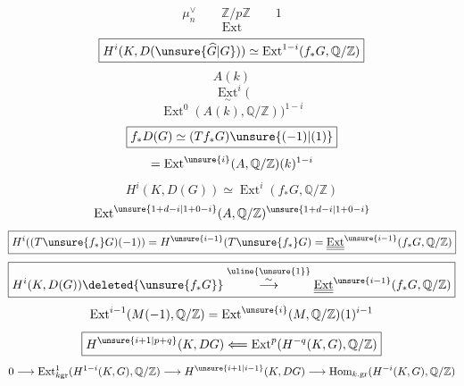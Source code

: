 \[
\mu_n^\vee\qquad\mathbb Z/p\mathbb Z\qquad1
\]
\[
\operatorname{Ext}
\]
\[
\boxed{H^i(K,D(\unsure{\widehat G|G}))\simeq
\operatorname{Ext}^{1-i}(f_*G,\mathbb Q/\mathbb Z)}
\]
\[
A(k)
\]
\[
\underset{\sim}{\operatorname{Ext}}^i(
\]
\[
\operatorname{Ext}^0(A(k),\mathbb Q/\mathbb Z))^{1-i}
\]
\[
\boxed{f_*D(G)\simeq(Tf_*G)\unsure{(-1)|(1)}}
\]
\[
=\operatorname{Ext}^{\unsure{i}}(A,\mathbb Q/\mathbb Z)(k)^{1-i}
\]
\[
H^i(K,D(G))\simeq\operatorname{Ext}^i(f_*G,\mathbb Q/\mathbb Z)
\]
\[
\operatorname{Ext}^{\unsure{1+d-i|1+0-i}}(A,\mathbb Q/\mathbb Z)^{\unsure{1+d-i|1+0-i}}
\]
\[
\boxed{H^i((T\unsure{f_*}G)(-1))=H^{\unsure{i-1}}(T\unsure{f_*}G)
=\underline{\underline{\operatorname{Ext}}}^{\unsure{i-1}}(f_*G,\mathbb Q/\mathbb Z)}
\]
\[
\boxed{H^i(K,D(G))\deleted{\unsure{f_*G}}
\overset{\uline{\unsure{1}}}{\overset{\sim}{\longrightarrow}}
\underline{\underline{\operatorname{Ext}}}^{\unsure{i-1}}(f_*G,\mathbb Q/\mathbb Z)}
\]
\[
\operatorname{Ext}^{i-1}(M(-1),\mathbb Q/\mathbb Z)
=\operatorname{Ext}^{\unsure{i}}(M,\mathbb Q/\mathbb Z)(1)^{i-1}
\]
\[
\boxed{H^{\unsure{i+1|p+q}}(K,DG)\Longleftarrow
\operatorname{Ext}^{p}(H^{-q}(K,G),\mathbb Q/\mathbb Z)}
\]
\[
0\longrightarrow\operatorname{Ext}^{1}_{k\mathrm{gr}}(H^{1-i}(K,G),\mathbb Q/\mathbb Z)
\longrightarrow H^{\unsure{i+1|i-1}}(K,DG)\longrightarrow
\operatorname{Hom}_{k.\mathrm{gr}}(H^{-i}(K,G),\mathbb Q/\mathbb Z)
\]

